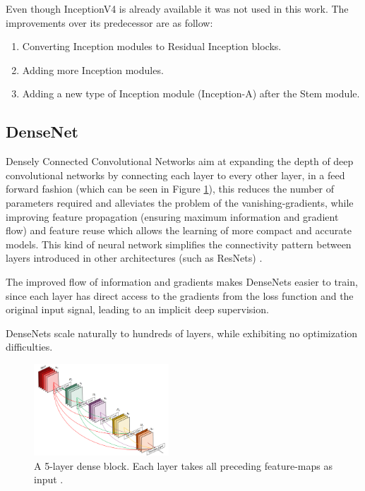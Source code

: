     \par Even though InceptionV4 \cite{szegedy2016inceptionv4} is already available it was not used in this work. The improvements over its predecessor are as follow: 
    \begin{enumerate}
        \item Converting Inception modules to Residual Inception blocks.
        \item Adding more Inception modules.
        \item Adding a new type of Inception module (Inception-A) after the Stem module.
    \end{enumerate}
    
    
    
   

    \newpage
    \subsection{DenseNet}

    Densely Connected Convolutional Networks aim at expanding the depth of deep convolutional networks by connecting each layer to every other layer, in a feed forward fashion (which can be seen in Figure \ref{fig:densenet}), this reduces  the number of parameters required and alleviates the problem of the vanishing-gradients, while improving feature propagation (ensuring maximum information and gradient flow) and feature reuse which allows the learning of more compact and accurate models. This kind of neural network simplifies the connectivity pattern between layers introduced in other architectures (such as ResNets) \cite{Szegedy2016}. \par

    The improved flow of information and gradients makes DenseNets easier to train, since each layer has direct access to the gradients from the loss function and the original input signal, leading to an implicit deep supervision. \par

    DenseNets scale naturally to hundreds of layers, while exhibiting no optimization difficulties.


    \begin{figure}[H]
        \centering
        \captionsetup{justification=centering}
        \includegraphics[width=0.45\textwidth]{Sections/2StateOfTheArt/2_images/denseNet.png}
        \caption[DenseNet layers.]{A 5-layer dense block. Each layer takes all preceding feature-maps as input \cite{Szegedy2016}. } 
        \label{fig:densenet}
    \end{figure}
    

